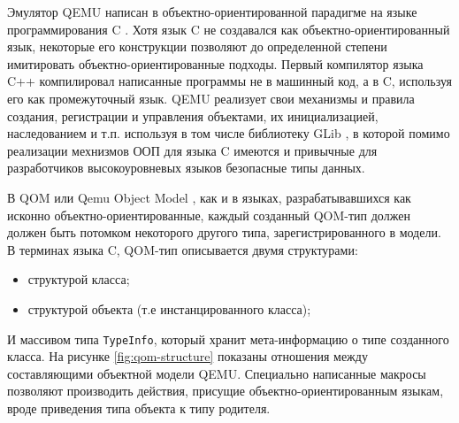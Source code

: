 Эмулятор QEMU написан в объектно-ориентированной парадигме на языке программирования C \cite{ooc}.
Хотя язык C не создавался как объектно-ориентированный язык, некоторые его конструкции позволяют
до определенной степени имитировать объектно-ориентированные подходы.
Первый компилятор языка C++ компилировал написанные программы не в машинный код, а в C, используя
его как промежуточный язык.
QEMU реализует свои механизмы и правила создания, регистрации и управления объектами, их инициализацией,
наследованием и т.п. используя в том числе библиотеку GLib \cite{glib}, в которой помимо реализации
мехнизмов ООП для языка C имеются и привычные для разработчиков высокоуровневых языков безопасные типы данных.

В QOM или Qemu Object Model \cite{qom-talking}, как и в языках, разрабатывавшихся как исконно объектно-ориентированные,
каждый созданный QOM-тип должен должен быть потомком некоторого другого типа, зарегистрированного в модели.
В терминах языка C, QOM-тип описывается двумя структурами:
\begin{itemize}
    \item структурой класса;
    \item структурой объекта (т.е инстанцированного класса);
\end{itemize}
И массивом типа \texttt{TypeInfo}, который хранит мета-информацию о типе созданного класса.
На рисунке \ref{fig:qom-structure} показаны отношения между составляющими объектной модели QEMU.
Специально написанные макросы позволяют производить действия, присущие объектно-ориентированным
языкам, вроде приведения типа объекта к типу родителя.

